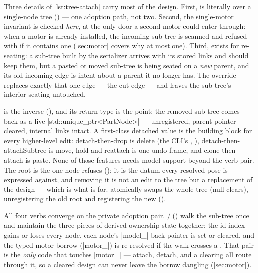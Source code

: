Three details of \cref{lst:tree-attach} carry most of the design. First,  is
literally  over a single-node tree
() --- one adoption path, not two. Second, the single-motor
invariant is checked \emph{here}, at the only door a second motor could enter through: when a
motor is already installed, the incoming sub-tree is scanned and refused with
 if it contains one (\cref{sec:motor} covers why at most one). Third,
 exists for re-seating: a sub-tree built by the serializer arrives with its
stored links and should keep them, but a pasted or moved sub-tree is being seated on a \emph{new}
parent, and its old incoming edge is intent about a parent it no longer has. The override replaces
exactly that one edge --- the cut edge --- and leaves the sub-tree's interior seating untouched.

 is the inverse (), and its return type is
the point: the removed sub-tree comes back as a live
\cppinline|std::unique_ptr<PartNode>| --- unregistered, parent pointer cleared, internal links
intact. A first-class detached value is the building block for every higher-level edit:
detach-then-drop is delete (the CLI's , ),
detach-then-attachSubtree is move, hold-and-reattach is one undo frame, and clone-then-attach is
paste. None of those features needs model support beyond the verb pair. The root is the one node
 refuses (): it is the datum every resolved pose is expressed against,
and removing it is not an edit to the tree but a replacement of the design ---
which is what  is for.  atomically swaps the whole tree
(null clears), unregistering the old root and registering the new
().

All four verbs converge on the private adoption pair.
/ () walk the
sub-tree once and maintain the three pieces of derived ownership state together: the id index
gains or loses every node, each node's \cppinline|model_| back-pointer is set or cleared, and the
typed motor borrow (\cppinline|motor_|) is re-resolved if the walk crosses a . That
pair is the \emph{only} code that touches \cppinline|motor_| --- attach, detach, and a clearing
 all route through it, so a cleared design can never leave the borrow dangling
(\cref{sec:motor}).

